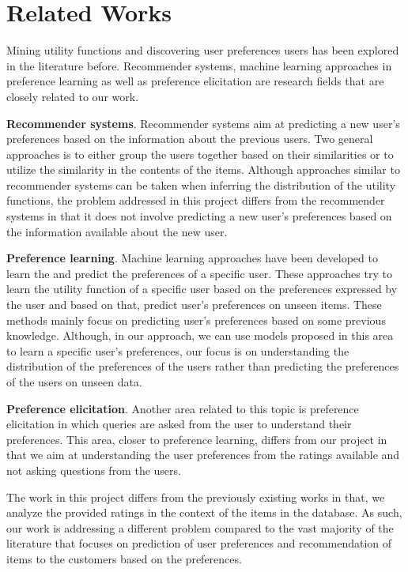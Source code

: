 \section{Related Works}
	Mining utility functions and discovering user preferences users has been explored in the literature before. Recommender systems, machine learning approaches in preference learning as well as preference elicitation are research fields that are closely related to our work.
	
	\textbf{Recommender systems}. Recommender systems \cite{Recommender:Rashid, Recommender:Burke} aim at predicting a new user's preferences based on the information about the previous users. Two general approaches is to either group the users together based on their similarities or to utilize the similarity in the contents of the items. Although approaches similar to recommender systems can be taken when inferring the distribution of the utility functions, the problem addressed in this project differs from the recommender systems in that it does not involve predicting a new user's preferences based on the information available about the new user. 
	
	\textbf{Preference learning}. Machine learning approaches \cite{GP:Chu, GP:Houlsby} have been developed to learn the and predict the preferences of a specific user. These approaches try to learn the utility function of a specific user based on the preferences expressed by the user and based on that, predict user's preferences on unseen items. These methods mainly focus on predicting user's preferences based on some previous knowledge. Although, in our approach, we can use models proposed in this area to learn a specific user's preferences, our focus is on understanding the distribution of the preferences of the users rather than predicting the preferences of the users on unseen data.

	\textbf{Preference elicitation}. Another area related to this topic is preference elicitation \cite{PE:Blum} in which queries are asked from the user to understand their preferences. This area, closer to preference learning, differs from our project in that we aim at understanding the user preferences from the ratings available and not asking questions from the users.

	The work in this project differs from the previously existing works in that, we analyze the provided ratings in the context of the items in the database. As such, our work is addressing a different problem compared to the vast majority of the literature that focuses on prediction of user preferences and recommendation of items to the customers based on the preferences.
